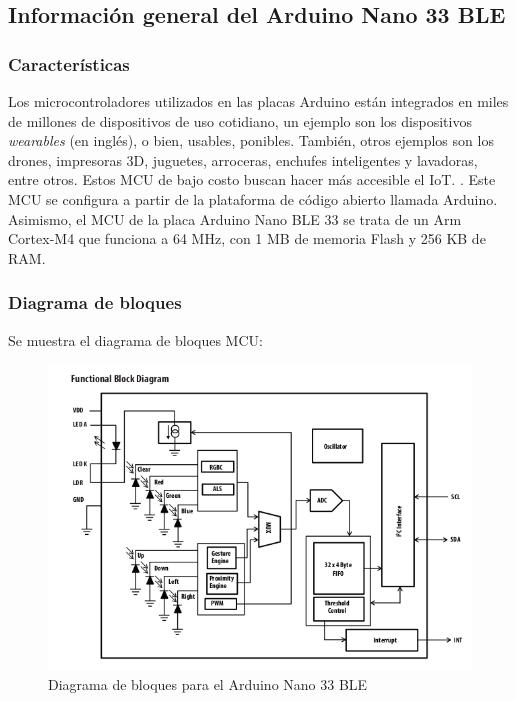 

\subsection{Información general del Arduino Nano 33 BLE}


    \subsubsection{Características}

    Los microcontroladores utilizados en las placas Arduino están integrados en miles de millones de dispositivos de uso cotidiano, un ejemplo son los dispositivos \textit{wearables} (en inglés), o bien, usables, ponibles. También, otros ejemplos son los drones, impresoras 3D, juguetes, arroceras, enchufes inteligentes y lavadoras, entre otros. Estos MCU de bajo costo buscan hacer más accesible el IoT. \cite{arduino}. Este MCU se configura a partir de la plataforma de código abierto llamada Arduino. Asimismo, el MCU de la placa Arduino Nano BLE 33 se trata de un Arm Cortex-M4 que funciona a 64 MHz, con 1 MB de memoria Flash y 256 KB de RAM. \cite{arduino}



    
    \subsubsection{Diagrama de bloques}
    Se muestra el diagrama de bloques MCU: 

    \begin{figure}[H]
        \centering
        \includegraphics[width=0.8\linewidth]{pics/diagrama_bloque.png}
        \caption{Diagrama de bloques para el Arduino Nano 33 BLE}
        \label{fig:bloque}
    \end{figure}
    
